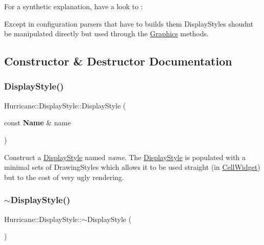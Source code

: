 For a synthetic explanation, have a look to \+:

Except in configuration parsers that have to builds them Display\+Styles shoudn\textquotesingle{}t be manipulated directly but used through the \hyperlink{classHurricane_1_1Graphics}{Graphics} methods. 

\subsection{Constructor \& Destructor Documentation}
\mbox{\label{classHurricane_1_1DisplayStyle_ac2923e24d8a17aba8f83803a807058bd}} 
\subsubsection{\texorpdfstring{Display\+Style()}{DisplayStyle()}}
{\footnotesize\ttfamily Hurricane\+::\+Display\+Style\+::\+Display\+Style (\begin{DoxyParamCaption}\item[{const \textbf{ Name} \&}]{name }\end{DoxyParamCaption})}

Construct a \hyperlink{classHurricane_1_1DisplayStyle}{Display\+Style} named {\itshape name}. The \hyperlink{classHurricane_1_1DisplayStyle}{Display\+Style} is populated with a minimal sets of Drawing\+Styles which allows it to be used straight (in \hyperlink{classHurricane_1_1CellWidget}{Cell\+Widget}) but to the cost of very ugly rendering. \mbox{\label{classHurricane_1_1DisplayStyle_ada5e04aa32eba45ff5c7567cd432f0e7}} 
\subsubsection{\texorpdfstring{$\sim$\+Display\+Style()}{~DisplayStyle()}}
{\footnotesize\ttfamily Hurricane\+::\+Display\+Style\+::$\sim$\+Display\+Style (\begin{DoxyParamCaption}{ }\end{DoxyParamCaption})}

